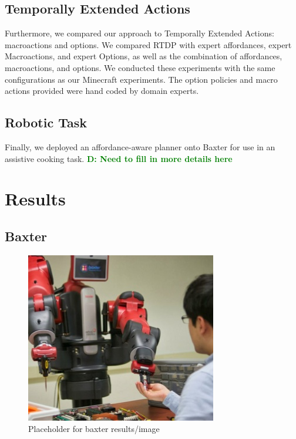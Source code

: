 \documentclass[conference]{IEEEtran}
\newcommand{\dnote}[1]{\textcolor{Green}{\textbf{D: #1}}}
\begin{document}
\subsection{Temporally Extended Actions}
Furthermore, we compared our approach to Temporally Extended Actions: macroactions and options. We compared RTDP with expert affordances,
expert Macroactions, and expert Options, as well as the combination of affordances, macroactions, and options. We conducted these experiments with the same configurations as our Minecraft experiments. The option policies and macro actions provided were hand coded by domain experts.

\subsection{Robotic Task}
Finally, we deployed an affordance-aware planner onto Baxter for use in an assistive cooking task. \dnote{Need to fill in more details here}

\section{Results}
\label{sec:results}

\subsection{Baxter}

\begin{figure}[H]
\centering
\includegraphics[scale=0.195]{figures/baxter_temp.jpg}%
  \caption{Placeholder for baxter results/image}
  \label{fig:baxter_results}
\end{figure}
\end{document}
